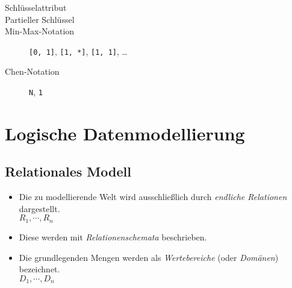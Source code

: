 \begin{description}
        		\item[Schlüsselattribut]
        		\item[Partieller Schlüssel]
        		\item[Min-Max-Notation] \texttt{[0, 1]}, \texttt{[1, *]}, \texttt{[1, 1]}, \dots
        		\item[Chen-Notation] \texttt{N}, \texttt{1}
        	\end{description}

\chapter{Logische Datenmodellierung} %
    \label{c:logicmodel}

    \section{Relationales Modell} %
        \begin{itemize}
        	\item Die zu modellierende Welt wird ausschließlich durch \textit{endliche Relationen} dargestellt. \\ \( R _ 1, \cdots, R _ n \)
        	\item Diese werden mit \textit{Relationenschemata} beschrieben.
        	\item Die grundlegenden Mengen werden als \textit{Wertebereiche} (oder \textit{Domänen}) bezeichnet. \\ \( D _ 1, \cdots, D _ n \)
        \end{itemize}

